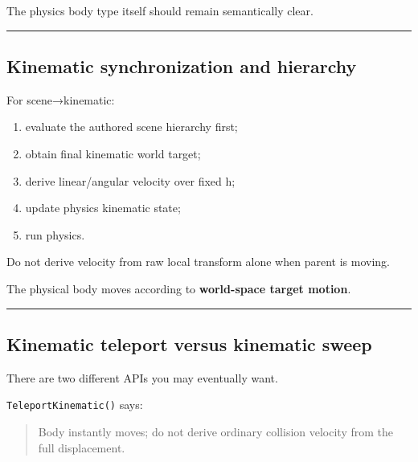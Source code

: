 The physics body type itself should remain semantically clear.

\begin{center}\rule{0.5\linewidth}{0.5pt}\end{center}

\subsection{Kinematic synchronization and hierarchy}\label{06-engine-ii-ch038-kinematic-synchronization-and-hierarchy}

\hypertarget{06-engine-ii-ch038-kinematic-synchronization-and-hierarchy}{}

For scene→kinematic:

\begin{enumerate}
\def\labelenumi{\arabic{enumi}.}
\tightlist
\item
  evaluate the authored scene hierarchy first;
\item
  obtain final kinematic world target;
\item
  derive linear/angular velocity over fixed h;
\item
  update physics kinematic state;
\item
  run physics.
\end{enumerate}

Do not derive velocity from raw local transform alone when parent is moving.

The physical body moves according to \textbf{world-space target motion}.

\begin{center}\rule{0.5\linewidth}{0.5pt}\end{center}

\subsection{Kinematic teleport versus kinematic sweep}\label{06-engine-ii-ch038-kinematic-teleport-versus-kinematic-sweep}

\hypertarget{06-engine-ii-ch038-kinematic-teleport-versus-kinematic-sweep}{}

There are two different APIs you may eventually want.

\texttt{TeleportKinematic()} says:

\begin{quote}
Body instantly moves; do not derive ordinary collision velocity from the full displacement.
\end{quote}

